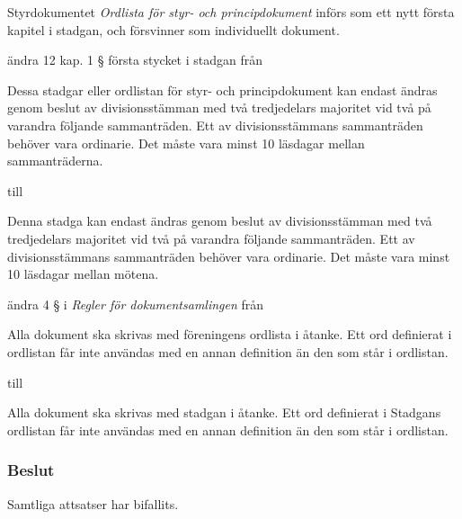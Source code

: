 \documentclass[protokoll]{dvd}
\begin{document}
\begin{attsatser}
	\item Styrdokumentet \emph{Ordlista för styr- och principdokument} införs som ett nytt första kapitel i stadgan, och försvinner som individuellt dokument.

	\item ändra 12 kap. 1 § första stycket i stadgan från

	\begin{displayquote}
		Dessa stadgar eller ordlistan för styr- och principdokument kan endast ändras genom beslut av divisionsstämman med två tredjedelars majoritet vid två på varandra följande sammanträden.
		Ett av divisionsstämmans sammanträden behöver vara ordinarie.
		Det måste vara minst 10 läsdagar mellan sammanträderna.
	\end{displayquote}

	till

	\begin{displayquote}
		Denna stadga kan endast ändras genom beslut av divisionsstämman med två tredjedelars majoritet vid två på varandra följande sammanträden.
		Ett av divisionsstämmans sammanträden behöver vara ordinarie.
		Det måste vara minst 10 läsdagar mellan mötena.
	\end{displayquote}

	\item ändra 4 § i \emph{Regler för dokumentsamlingen} från

	\begin{displayquote}
		Alla dokument ska skrivas med föreningens ordlista i åtanke.
		Ett ord definierat i ordlistan får inte användas med en annan definition än den som står i ordlistan.
	\end{displayquote}

	till

	\begin{displayquote}
        Alla dokument ska skrivas med stadgan i åtanke.
        Ett ord definierat i Stadgans ordlistan får inte användas med en annan definition än den som står i ordlistan.
    \end{displayquote}
\end{attsatser}

\subsubsection{Beslut}
\begin{attsatser}
	\item Samtliga attsatser har bifallits.
\end{attsatser}
\end{document}

